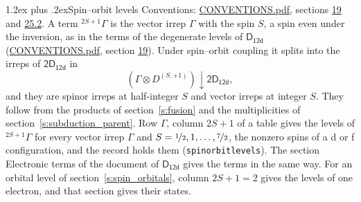 \documentclass[10pt,a4paper]{article}
\makeatletter
\renewcommand\section{\@startsection{section}{1}{\z@}{-3ex plus -1ex minus -.2ex}%
  {1.2ex plus .2ex}{\normalfont\large\sffamily\bfseries\color{parttitle}}}
\numberwithin{equation}{section}
\newcommand{\grp}[1]{\mathsf{#1}}
\newcommand{\restr}[2]{#1\!\downarrow#2}
\newcommand{\irrJp}[2]{D^{(#1,#2)}}
\newcommand{\irrprod}{\otimes}
\newcommand{\term}[2]{{}^{#1}#2}
\makeatother
\begin{document}
\section{Spin--orbit levels}\label{s:spin_orbit}
Conventions: \href{../../CONVENTIONS.pdf}{CONVENTIONS.pdf}, sections \href{../../../rotation/CONVENTIONS.pdf\#conv.19}{19} and \href{../../CONVENTIONS.pdf\#conv.25.2}{25.2}.
\leavevmode\label{n:local.spin}\label{n:symbol.term}A term $\term{2S+1}{\Gamma}$ is the vector irrep $\Gamma$ with the spin $S$, a spin even under the inversion, as in the terms of the degenerate levels of \href{../../../rotation/data/pdf/D12d.pdf}{$\grp{D_{12d}}$} (\href{../../CONVENTIONS.pdf}{CONVENTIONS.pdf}, section \href{../../../rotation/CONVENTIONS.pdf\#conv.19}{19}). Under spin--orbit coupling it splits into the irreps of $\grp{2D_{12d}}$ in
\begin{equation}\label{e:spinorbit}\restr{(\Gamma \irrprod \irrJp{S}{+1})}{\grp{2D_{12d}}},\end{equation}
and they are spinor irreps at half-integer $S$ and vector irreps at integer $S$. They follow from the products of section~\ref{s:fusion} and the multiplicities of section~\ref{s:subduction_parent}. Row $\Gamma$, column $2S + 1$ of a table gives the levels of $\term{2S+1}{\Gamma}$ for every vector irrep $\Gamma$ and $S = \nicefrac{1}{2}, 1, \dots, \nicefrac{7}{2}$, the nonzero spins of a d or f configuration, and the record holds them (\texttt{spinorbitlevels}). The section Electronic terms of the document of \href{../../../rotation/data/pdf/D12d.pdf}{$\grp{D_{12d}}$} gives the terms in the same way. For an orbital level of section~\ref{s:spin_orbitals}, column $2S + 1 = 2$ gives the levels of one electron, and that section gives their states.
\end{document}
